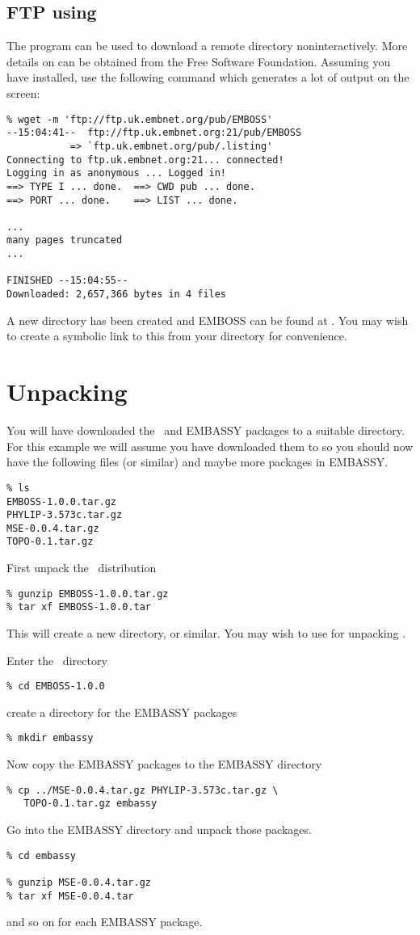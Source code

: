 \documentclass{report}
\begin{document}
\subsection{FTP using }
The program  can be used to download a remote directory noninteractively. More details on  can be obtained from the Free Software Foundation. Assuming you have  installed, use the following command which generates a lot of output on the screen:
\begin{verbatim}
% wget -m 'ftp://ftp.uk.embnet.org/pub/EMBOSS'
--15:04:41--  ftp://ftp.uk.embnet.org:21/pub/EMBOSS
           => `ftp.uk.embnet.org/pub/.listing'
Connecting to ftp.uk.embnet.org:21... connected!
Logging in as anonymous ... Logged in!
==> TYPE I ... done.  ==> CWD pub ... done.
==> PORT ... done.    ==> LIST ... done.

...
many pages truncated
...

FINISHED --15:04:55--
Downloaded: 2,657,366 bytes in 4 files
\end{verbatim}
A new directory  has been created and EMBOSS can be found at . You may wish to create a symbolic link to this from your  directory for convenience.


\section{Unpacking}

You will have downloaded the \EMBOSS\ and EMBASSY packages to a suitable directory. For this example we will assume you have downloaded them to  so you should now have the following files (or similar) and maybe more packages in EMBASSY. 
\begin{verbatim}
% ls
EMBOSS-1.0.0.tar.gz
PHYLIP-3.573c.tar.gz
MSE-0.0.4.tar.gz
TOPO-0.1.tar.gz
\end{verbatim}
First unpack the \EMBOSS\ distribution
\begin{verbatim}
% gunzip EMBOSS-1.0.0.tar.gz
% tar xf EMBOSS-1.0.0.tar
\end{verbatim}
This will create a new directory,  or similar. You may wish to use  for unpacking \EMBOSS.

Enter the \EMBOSS\ directory
\begin{verbatim}
% cd EMBOSS-1.0.0
\end{verbatim}
create a directory for the EMBASSY packages
\begin{verbatim}
% mkdir embassy
\end{verbatim}
Now copy the EMBASSY packages to the EMBASSY directory
\begin{verbatim}
% cp ../MSE-0.0.4.tar.gz PHYLIP-3.573c.tar.gz \
   TOPO-0.1.tar.gz embassy
\end{verbatim}
Go into the EMBASSY directory and unpack those packages.
\begin{verbatim}
% cd embassy

% gunzip MSE-0.0.4.tar.gz
% tar xf MSE-0.0.4.tar
\end{verbatim}
and so on for each EMBASSY package.
\end{document}
